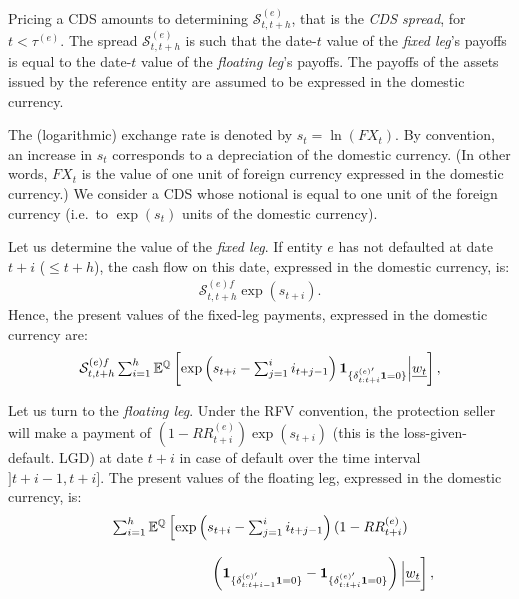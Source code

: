 \documentclass[
  12pt,
]{book}
\theoremstyle{definition}
\theoremstyle{definition}
\theoremstyle{definition}
\theoremstyle{definition}
\theoremstyle{remark}
\begin{document}
Pricing a CDS amounts to determining \(\mathcal{S}_{t,t+h}^{(e)}\), that is the \emph{CDS spread}, for \(t < \tau^{(e)}\). The spread \(\mathcal{S}_{t,t+h}^{(e)}\) is such that the date-\(t\) value of the \emph{fixed leg}'s payoffs is equal to the date-\(t\) value of the \emph{floating leg}'s payoffs. The payoffs of the assets issued by the reference entity are assumed to be expressed in the domestic currency.

The (logarithmic) exchange rate is denoted by \(s_t = \ln ( FX_t )\). By convention, an increase in \(s_t\) corresponds to a depreciation of the domestic currency. (In other words, \(FX_t\) is the value of one unit of foreign currency expressed in the domestic currency.) We consider a CDS whose notional is equal to one unit of the foreign currency
(i.e.~to \(\exp (s_t)\) units of the domestic currency).

Let us determine the value of the \emph{fixed leg}. If entity \(e\) has not defaulted at date \(t+i\) (\(\le t+h\)), the cash flow on this date, expressed in the domestic currency, is:
\begin{equation*}
\begin{array}{lll}
\mathcal{S}^{(e) f}_{t,t+h} \exp(s_{t+i}).
\end{array}
\end{equation*}
Hence, the present values of the fixed-leg payments, expressed in the domestic currency are:
\begin{equation*}
\begin{array}{lll}
\mathcal{S}^{(e) f}_{t, t+h}  \sum_{i=1}^{h}   \mathbb{E}^{\mathbb{Q}}
\left[\exp \left( s_{t+i} - \sum_{j = 1}^{i} i_{t + j - 1} \right) \textbf{1}_{\{ \delta^{(e) '}_{t : t+i} {\bf 1} = 0 \} }
\Big|  \underline{w_t} \right],
\end{array}
\end{equation*}

Let us turn to the \emph{floating leg}. Under the RFV convention, the protection seller will make a payment of \((1 - RR^{(e)}_{t+i}) \exp(s_{t+i})\) (this is the loss-given-default. LGD) at date \(t+i\) in case of default over the time interval \(] t + i - 1, t+i ]\). The present values of the floating leg, expressed in the domestic currency, is:
\begin{equation*}
\begin{array}{lll}
&& \sum_{i=1}^{h}   \mathbb{E}^{\mathbb{Q}} \left[ \exp \left( s_{t+i} - \sum_{j = 1}^{i} i_{t + j - 1}
\right)   (1 - RR^{(e)}_{t+i})\right. \\ \\
&& \hspace{7em} \left.   \left( \textbf{1}_{\{ \delta^{(e) '}_{t : t+i-1} {\bf 1} = 0 \} } - \textbf{1}_{\{ \delta^{(e) '}_{t : t+i}
{\bf 1} = 0 \} } \right)  \Big|  \underline{w_t}   \right],\label{eq:MCCDSPS}
\end{array}
\end{equation*}
\end{document}

